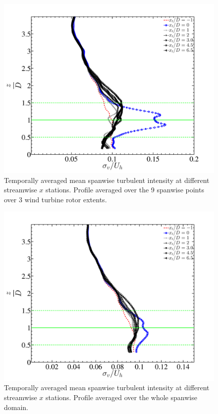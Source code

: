 \begin{figure}
\centering
\includegraphics[width = 0.8\linewidth]{stats/vfluc_9points_avg.pdf}
\caption[Mean $\sigma_{v}$ at $x$ stations 2]{Temporally averaged mean spanwise turbulent intensity at different streamwise $x$ stations. Profile averaged over the  9 spanwise points over 3 wind turbine rotor extents.}\label{fig:vstat2}
\end{figure}
\begin{figure}
\centering
\includegraphics[width = 0.8\linewidth]{stats/vfluc_Npoints_avg.pdf}
\caption[Mean $\sigma_{v}$ at $x$ stations 3]{Temporally averaged mean spanwise turbulent intensity at different streamwise $x$ stations. Profile averaged over the whole spanwise domain.}\label{fig:vstat3}
\end{figure}
